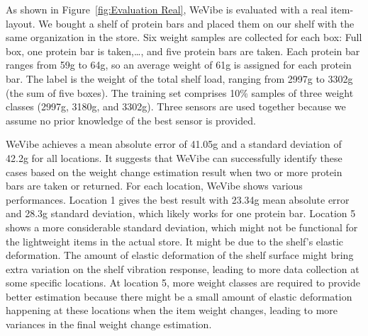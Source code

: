 As shown in Figure~\ref{fig:Evaluation Real}, WeVibe is evaluated with a real item-layout. We bought a shelf of protein bars and placed them on our shelf with the same organization in the store. Six weight samples are collected for each box: Full box, one protein bar is taken,\ldots, and five protein bars are taken. Each protein bar ranges from 59g to 64g, so an average weight of 61g is assigned for each protein bar. The label is the weight of the total shelf load, ranging from 2997g to 3302g (the sum of five boxes). The training set comprises 10\% samples of three weight classes (2997g, 3180g, and 3302g). Three sensors are used together because we assume no prior knowledge of the best sensor is provided.

WeVibe achieves a mean absolute error of 41.05g and a standard deviation of 42.2g for all locations. It suggests that WeVibe can successfully identify these cases based on the weight change estimation result when two or more protein bars are taken or returned. For each location, WeVibe shows various performances. Location 1 gives the best result with 23.34g mean absolute error and 28.3g standard deviation, which likely works for one protein bar. Location 5 shows a more considerable standard deviation, which might not be functional for the lightweight items in the actual store. It might be due to the shelf's elastic deformation. The amount of elastic deformation of the shelf surface might bring extra variation on the shelf vibration response, leading to more data collection at some specific locations. At location 5, more weight classes are required to provide better estimation because there might be a small amount of elastic deformation happening at these locations when the item weight changes, leading to more variances in the final weight change estimation.






